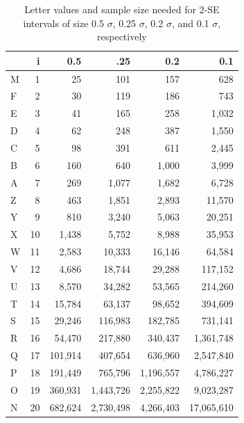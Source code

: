 \documentclass[12pt,oneside]{article}
\begin{document}
\begin{appendix}
\begin{table}
  \begin{center}
  \begin{tabular}{lrrrrr}
    \toprule
      &  i &    0.5 &     .25 &     0.2 &      0.1 \\
    \midrule
    M &  1 &     25 &     101 &     157 &      628 \\
    F &  2 &     30 &     119 &     186 &      743 \\
    E &  3 &     41 &     165 &     258 &     1,032 \\
    D &  4 &     62 &     248 &     387 &     1,550 \\
    C &  5 &     98 &     391 &     611 &     2,445 \\[3pt]
    B &  6 &    160 &     640 &    1,000 &     3,999 \\
    A &  7 &    269 &    1,077 &    1,682 &     6,728 \\
    Z &  8 &    463 &    1,851 &    2,893 &    11,570 \\
    Y &  9 &    810 &    3,240 &    5,063 &    20,251 \\
    X & 10 &   1,438 &    5,752 &    8,988 &    35,953  \\[3pt]
    W & 11 &   2,583 &   10,333 &   16,146 &    64,584 \\
    V & 12 &   4,686 &   18,744 &   29,288 &   117,152 \\
    U & 13 &   8,570 &   34,282 &   53,565 &   214,260 \\
    T & 14 &  15,784 &   63,137 &   98,652 &   394,609 \\
    S & 15 &  29,246 &  116,983 &  182,785 &   731,141  \\[3pt]
    R & 16 &  54,470 &  217,880 &  340,437 &  1,361,748 \\
    Q & 17 & 101,914 &  407,654 &  636,960 &  2,547,840 \\
    P & 18 & 191,449 &  765,796 & 1,196,557 &  4,786,227 \\
    O & 19 & 360,931 & 1,443,726 & 2,255,822 &  9,023,287 \\
    N & 20 & 682,624 & 2,730,498 & 4,266,403 & 17,065,610 \\
    \bottomrule
    
  \end{tabular}
  \end{center}
  \caption{Letter values and sample size needed for 2-SE intervals of size 0.5 $\sigma$, 0.25 $\sigma$, 0.2 $\sigma$, and 0.1 $\sigma$, respectively }
  \label{tbl:lv-error}
\end{table}

\end{appendix}


\end{document}
